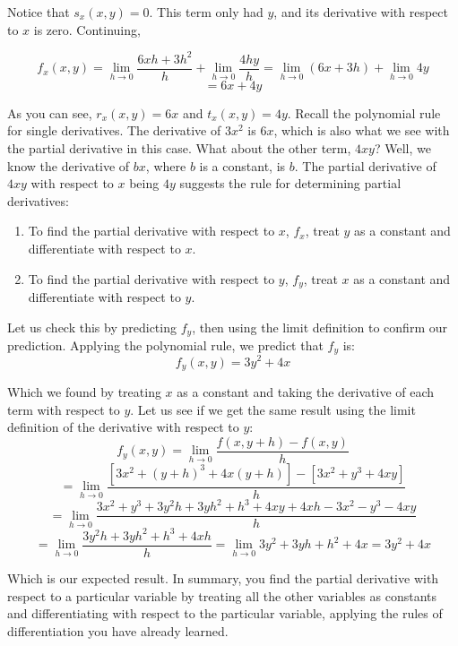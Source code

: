 Notice that $s_x(x, y) = 0$. This term only had $y$, and its derivative with 
respect to $x$ is zero. Continuing, 

$$f_x(x, y) = \lim_{h \to 0} \frac{6xh + 3h^2}{h} + \lim_{h \to 0} \frac{4hy}{h}
= \lim_{h \to 0} (6x + 3h) + \lim_{h \to 0} 4y$$
$$= 6x + 4y$$

As you can see, $r_x(x, y) = 6x$ and $t_x(x, y) = 4y$. Recall the polynomial 
rule for single derivatives. The derivative of $3x^2$ is $6x$, which is also 
what we see with the partial derivative in this case. What about the other 
term, $4xy$? Well, we know the derivative of $bx$, where $b$ is a constant, is 
$b$. The partial derivative of $4xy$ with respect to $x$ being $4y$ suggests 
the rule for determining partial derivatives:

\begin{mdframed}[style = important, frametitle = {Rule for Finding Partial 
Derivatives of $f(x, y)$}]
\begin{enumerate}
    \item To find the partial derivative with respect to $x$, $f_x$, treat $y$ 
    as a constant and differentiate with respect to $x$.
    \item To find the partial derivative with respect to $y$, $f_y$, treat $x$ 
    as a constant and differentiate with respect to $y$.
\end{enumerate}
\end{mdframed}

Let us check this by predicting $f_y$, then using the limit definition to 
confirm our prediction. Applying the polynomial rule, we predict that $f_y$ is:
$$f_y(x, y) = 3y^2 + 4x$$

Which we found by treating $x$ as a constant and taking the derivative of each 
term with respect to $y$. Let us see if we get the same result using the limit 
definition of the derivative with respect to $y$:
$$f_y(x, y) = \lim_{h \to 0} \frac{f(x, y + h) - f(x, y)}{h}$$
$$= \lim_{h \to 0} \frac{\left[3x^2 + \left(y + h \right)^3 + 4x \left(y + h 
\right) \right] - \left[ 3x^2 + y^3 + 4xy \right]}{h}$$
$$= \lim_{h \to 0} \frac{3x^2 + y^3 + 3y^2h + 3yh^2 + h^3 + 4xy + 4xh - 3x^2 - 
y^3 - 4xy}{h}$$
$$= \lim_{h \to 0} \frac{3y^2h + 3yh^2 + h^3 + 4xh}{h} = \lim_{h \to 0} 3y^2 + 
3yh + h^2 + 4x = 3y^2 + 4x$$

Which is our expected result. In summary, you find the partial derivative with 
respect to a particular variable by treating all the other variables as 
constants and differentiating with respect to the particular variable, applying
the rules of differentiation you have already learned. 

